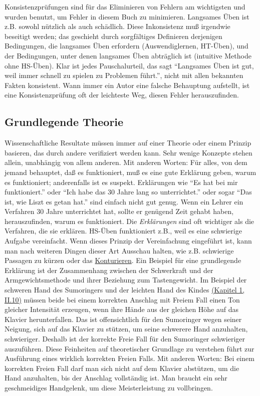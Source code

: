 Konsistenzprüfungen sind für das Eliminieren von Fehlern am wichtigsten und wurden benutzt, um Fehler in diesem Buch zu minimieren.
Langsames Üben ist z.B. sowohl nützlich als auch schädlich.
Diese Inkonsistenz muß irgendwie beseitigt werden; das geschieht durch sorgfältiges Definieren derjenigen Bedingungen, die langsames Üben erfordern (Auswendiglernen, HT-Üben), und der Bedingungen, unter denen langsames Üben abträglich ist (intuitive Methode ohne HS-Üben).
Klar ist jedes Pauschalurteil, das sagt \enquote{Langsames Üben ist gut, weil immer schnell zu spielen zu Problemen führt.}, nicht mit allen bekannten Fakten konsistent.
Wann immer ein Autor eine falsche Behauptung aufstellt, ist eine Konsistenzprüfung oft der leichteste Weg, diesen Fehler herauszufinden.


\subsection{Grundlegende Theorie}
\label{c3_3f}

Wissenschaftliche Resultate müssen immer auf einer Theorie oder einem Prinzip basieren, das durch andere verifiziert werden kann.
Sehr wenige Konzepte stehen allein, unabhängig von allem anderen.
Mit anderen Worten: Für alles, von dem jemand behauptet, daß es funktioniert, muß es eine gute Erklärung geben, warum es funktioniert; anderenfalls ist es suspekt.
Erklärungen wie \enquote{Es hat bei mir funktioniert.} oder \enquote{Ich habe das 30 Jahre lang so unterrichtet.} oder sogar \enquote{Das ist, wie Liszt es getan hat.} sind einfach nicht gut genug.
Wenn ein Lehrer ein Verfahren 30 Jahre unterrichtet hat, sollte er genügend Zeit gehabt haben, herauszufinden, warum es funktioniert.
Die \textit{Erklärungen} sind oft wichtiger als die Verfahren, die sie erklären.
HS-Üben funktioniert z.B., weil es eine schwierige Aufgabe vereinfacht.
Wenn dieses Prinzip der Vereinfachung eingeführt ist, kann man nach weiteren Dingen dieser Art Ausschau halten, wie z.B. schwierige Passagen zu kürzen oder das \hyperref[c1iii8]{Konturieren}.
Ein Beispiel für eine grundlegende Erklärung ist der Zusammenhang zwischen der Schwerkraft und der Armgewichtsmethode und ihrer Beziehung zum Tastengewicht.
Im Beispiel der schweren Hand des Sumoringers und der leichten Hand des Kindes \hyperref[c1ii10]{(Kapitel 1, II.10)} müssen beide bei einem korrekten Anschlag mit Freiem Fall einen Ton gleicher Intensität erzeugen, wenn ihre Hände aus der gleichen Höhe auf das Klavier herunterfallen.
Das ist offensichtlich  für den Sumoringer wegen seiner Neigung, sich auf das Klavier zu stützen, um seine schwerere Hand anzuhalten, schwieriger.
Deshalb ist der korrekte Freie Fall für den Sumoringer schwieriger auszuführen.
Diese Feinheiten auf theoretischer Grundlage zu verstehen führt zur Ausführung eines wirklich korrekten Freien Falls.
Mit anderen Worten: Bei einem korrekten Freien Fall darf man sich nicht auf dem Klavier abstützen, um die Hand anzuhalten, bis der Anschlag vollständig ist.
Man braucht ein sehr geschmeidiges Handgelenk, um diese Meisterleistung zu vollbringen.


